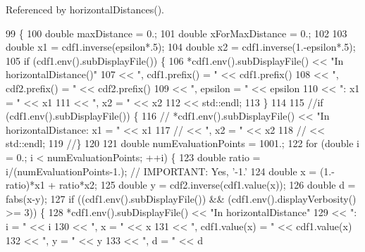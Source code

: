 Referenced by horizontal\-Distances().


\begin{DoxyCode}
99 \{
100   \textcolor{keywordtype}{double} maxDistance     = 0.;
101   \textcolor{keywordtype}{double} xForMaxDistance = 0.;
102 
103   \textcolor{keywordtype}{double} x1 = cdf1.inverse(epsilon*.5);
104   \textcolor{keywordtype}{double} x2 = cdf1.inverse(1.-epsilon*.5);
105   \textcolor{keywordflow}{if} (cdf1.env().subDisplayFile()) \{
106     *cdf1.env().subDisplayFile() << \textcolor{stringliteral}{"In horizontalDistance()"}
107                                  << \textcolor{stringliteral}{", cdf1.prefix() = "} << cdf1.prefix()
108                                  << \textcolor{stringliteral}{", cdf2.prefix() = "} << cdf2.prefix()
109                                  << \textcolor{stringliteral}{", epsilon = "}       << epsilon
110                                  << \textcolor{stringliteral}{": x1 = "}            << x1
111                                  << \textcolor{stringliteral}{", x2 = "}            << x2
112                                  << std::endl;
113   \}
114 
115   \textcolor{comment}{//if (cdf1.env().subDisplayFile()) \{}
116   \textcolor{comment}{//  *cdf1.env().subDisplayFile() << "In horizontalDistance: x1 = " << x1}
117   \textcolor{comment}{//                              << ", x2 = " << x2}
118   \textcolor{comment}{//                              << std::endl;}
119   \textcolor{comment}{//\}}
120 
121   \textcolor{keywordtype}{double} numEvaluationPoints = 1001.;
122   \textcolor{keywordflow}{for} (\textcolor{keywordtype}{double} i = 0.; i < numEvaluationPoints; ++i) \{
123     \textcolor{keywordtype}{double} ratio = i/(numEvaluationPoints-1.); \textcolor{comment}{// IMPORTANT: Yes, '-1.'}
124     \textcolor{keywordtype}{double} x = (1.-ratio)*x1 + ratio*x2;
125     \textcolor{keywordtype}{double} y = cdf2.inverse(cdf1.value(x));
126     \textcolor{keywordtype}{double} d = fabs(x-y);
127     \textcolor{keywordflow}{if} ((cdf1.env().subDisplayFile()) && (cdf1.env().displayVerbosity() >= 3)) \{
128       *cdf1.env().subDisplayFile() << \textcolor{stringliteral}{"In horizontalDistance"}
129                                    << \textcolor{stringliteral}{": i = "}                  << i
130                                    << \textcolor{stringliteral}{", x = "}                  << x
131                                    << \textcolor{stringliteral}{", cdf1.value(x) = "}      << cdf1.value(x)
132                                    << \textcolor{stringliteral}{", y = "}                  << y
133                                    << \textcolor{stringliteral}{", d = "}                  << d

\end{DoxyCode}
